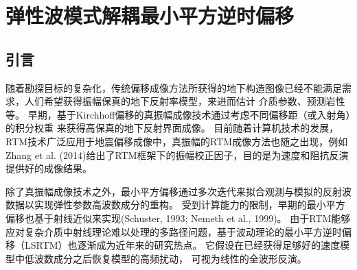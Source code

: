 \chapter{弹性波模式解耦最小平方逆时偏移}
\label{cha:MD-ELSRTM}
\section{引言}
随着勘探目标的复杂化，传统偏移成像方法所获得的地下构造图像已经不能满足需求，人们希望获得振幅保真的地下反射率模型，来进而估计
介质参数、预测岩性等。
早期，基于Kirchhoff偏移的真振幅成像技术通过考虑不同偏移距（或入射角）的积分权重
来获得高保真的地下反射界面成像\cite{BeylkinEtAl1985,Bleistein1987}。
目前随着计算机技术的发展，RTM技术广泛应用于地震偏移成像中，真振幅的RTM成像方法也随之出现，例如
Zhang et al.
(2014)\cite{Zhang2014}给出了RTM框架下的振幅校正因子，目的是为速度和阻抗反演提供好的成像结果。

除了真振幅成像技术之外，最小平方偏移通过多次迭代来拟合观测与模拟的反射波数据以实现弹性参数高波数成分的重构。
受到计算能力的限制，早期的最小平方偏移也基于射线近似来实现(Schuster, 1993\cite{Schuster1993}; Nemeth
et al., 1999\cite{Nemeth1999})。
由于RTM能够应对复杂介质中射线理论难以处理的多路径问题，基于波动理论的最小平方逆时偏移（LSRTM）也逐渐成为近年来的研究热点。
它假设在已经获得足够好的速度模型中低波数成分之后恢复模型的高频扰动，
可视为线性的全波形反演。


